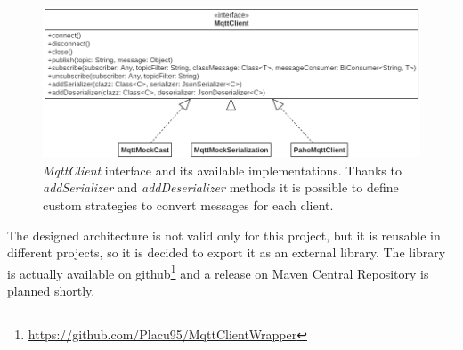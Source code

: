 \begin{figure}[h]
    \centering
    \includegraphics[width=\textwidth]{figures/mqttClient.png}
    \caption[\textit{MqttClient} interface and its available implementations]{\textit{MqttClient} interface and its available implementations. Thanks to \mbox{\textit{addSerializer}} and \mbox{\textit{addDeserializer}} methods it is possible to define custom strategies to convert messages for each client.}
    \label{fig:mqtt}
\end{figure}

\noindent The designed architecture is not valid only for this project, but it is reusable in different projects, so it is decided to export it as an external library. The library is actually available on github\footnote{\href{https://github.com/Placu95/MqttClientWrapper}{https://github.com/Placu95/MqttClientWrapper}} and a release on Maven Central Repository is planned shortly.

